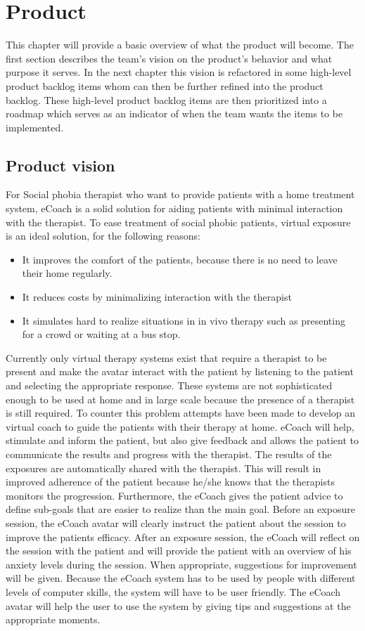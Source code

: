 \chapter{Product}
This chapter will provide a basic overview of what the product will become. The first section describes the team's vision on the product's behavior and what purpose it serves. In the next chapter this vision is refactored in some high-level product backlog items whom can then be further refined into the product backlog. These high-level product backlog items are then prioritized into a roadmap which serves as an indicator of when the team wants the items to be implemented.

\section{Product vision}
For Social phobia therapist who want to provide patients with a home treatment system, \gls{eCoach} is a  solid solution for aiding patients with minimal interaction with the therapist. To ease treatment of social phobic patients, virtual exposure is an ideal solution, for the following reasons:
\begin{itemize}
\item It improves the comfort of the patients, because there is no need to leave their home regularly.
\item It reduces costs by minimalizing interaction with the therapist
\item It simulates hard to realize situations in in vivo therapy such as presenting for a crowd or waiting at a bus stop.
\end{itemize}
Currently only virtual therapy systems exist that require a therapist to be present and make the \gls{avatar} interact with the patient by listening to the patient and selecting the appropriate response. These systems are not sophisticated enough to be used at home and in large scale because the presence of a therapist is still required. To counter this problem attempts have been made to develop an virtual coach to guide the patients with their therapy at home.
\gls{eCoach} will help, stimulate and inform the patient, but also give feedback and allows the patient to communicate the results and progress with the therapist. The results of the exposures are automatically shared with the therapist. This will result in improved adherence of the patient because he/she knows that the therapists monitors the progression.
Furthermore, the \gls{eCoach} gives the patient advice to define sub-goals that are easier to realize than the main goal. Before an exposure session, the \gls{eCoach} \gls{avatar} will clearly instruct the patient about the session to improve the patients efficacy. After an exposure session, the \gls{eCoach} will reflect on the session with the patient and will provide the patient with an overview of his anxiety levels during the session. When appropriate, suggestions for improvement will be given.
Because the \gls{eCoach} system has to be used by people with different levels of computer skills, the system will have to be user friendly. The \gls{eCoach} \gls{avatar} will help the user to use the system by giving tips and suggestions at the appropriate moments.


